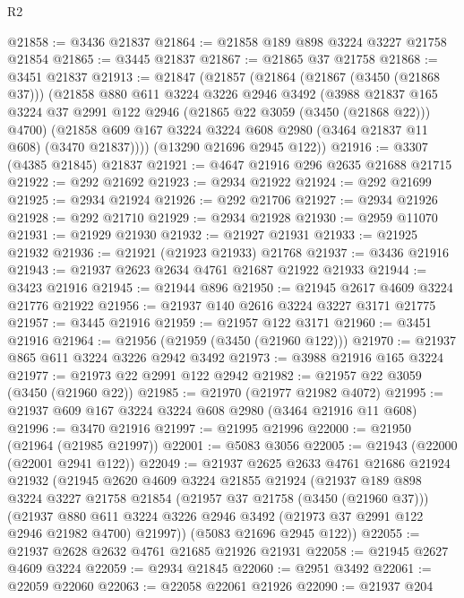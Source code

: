 \begin{lexlean}{R2}
\begin{coremodule}
@21858 := @3436 @21837
@21864 := @21858 @189 @898 @3224 @3227 @21758 @21854
@21865 := @3445 @21837
@21867 := @21865 @37 @21758
@21868 := @3451 @21837
@21913 := @21847
    (@21857
      (@21864
        (@21867 (@3450 (@21868 @37)))
        (@21858
          @880
          @611
          @3224
          @3226
          @2946
          @3492
          (@3988
            @21837
            @165
            @3224
            @37
            @2991
            @122
            @2946
            (@21865 @22 @3059 (@3450 (@21868 @22)))
            @4700)
          (@21858 @609 @167 @3224 @3224 @608 @2980 (@3464 @21837 @11 @608) (@3470 @21837))))
      (@13290 @21696 @2945 @122))
@21916 := @3307 (@4385 @21845) @21837
@21921 := @4647 @21916 @296 @2635 @21688 @21715
@21922 := @292 @21692
@21923 := @2934 @21922
@21924 := @292 @21699
@21925 := @2934 @21924
@21926 := @292 @21706
@21927 := @2934 @21926
@21928 := @292 @21710
@21929 := @2934 @21928
@21930 := @2959 @11070
@21931 := @21929 @21930
@21932 := @21927 @21931
@21933 := @21925 @21932
@21936 := @21921 (@21923 @21933) @21768
@21937 := @3436 @21916
@21943 := @21937 @2623 @2634 @4761 @21687 @21922 @21933
@21944 := @3423 @21916
@21945 := @21944 @896
@21950 := @21945 @2617 @4609 @3224 @21776 @21922
@21956 := @21937 @140 @2616 @3224 @3227 @3171 @21775
@21957 := @3445 @21916
@21959 := @21957 @122 @3171
@21960 := @3451 @21916
@21964 := @21956 (@21959 (@3450 (@21960 @122)))
@21970 := @21937 @865 @611 @3224 @3226 @2942 @3492
@21973 := @3988 @21916 @165 @3224
@21977 := @21973 @22 @2991 @122 @2942
@21982 := @21957 @22 @3059 (@3450 (@21960 @22))
@21985 := @21970 (@21977 @21982 @4072)
@21995 := @21937 @609 @167 @3224 @3224 @608 @2980 (@3464 @21916 @11 @608)
@21996 := @3470 @21916
@21997 := @21995 @21996
@22000 := @21950 (@21964 (@21985 @21997))
@22001 := @5083 @3056
@22005 := @21943 (@22000 (@22001 @2941 @122))
@22049 := @21937
    @2625
    @2633
    @4761
    @21686
    @21924
    @21932
    (@21945
      @2620
      @4609
      @3224
      @21855
      @21924
      (@21937
        @189
        @898
        @3224
        @3227
        @21758
        @21854
        (@21957 @37 @21758 (@3450 (@21960 @37)))
        (@21937
          @880
          @611
          @3224
          @3226
          @2946
          @3492
          (@21973 @37 @2991 @122 @2946 @21982 @4700)
          @21997))
      (@5083 @21696 @2945 @122))
@22055 := @21937 @2628 @2632 @4761 @21685 @21926 @21931
@22058 := @21945 @2627 @4609 @3224
@22059 := @2934 @21845
@22060 := @2951 @3492
@22061 := @22059 @22060
@22063 := @22058 @22061 @21926
@22090 := @21937
    @204

\end{coremodule}
\end{lexlean}
